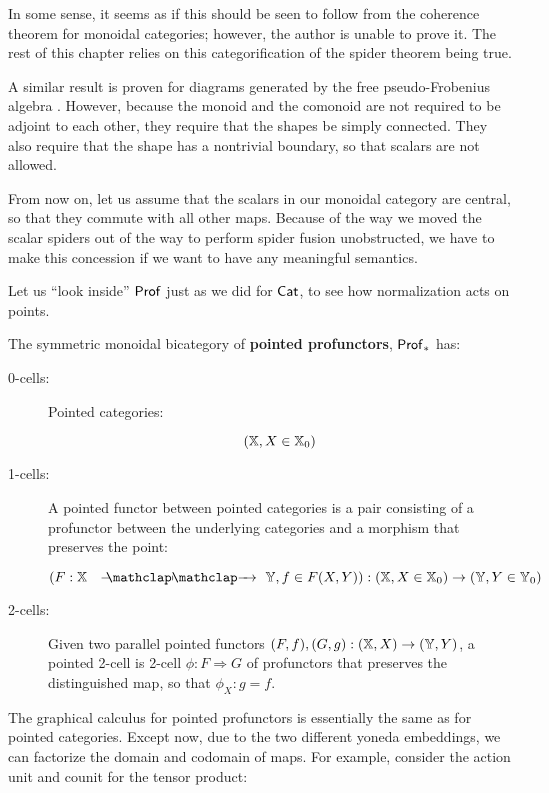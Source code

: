 In some sense, it seems as if this should be seen to follow from the coherence theorem for monoidal categories; however, the author is unable to prove it.
The rest of this chapter relies on this categorification of the spider theorem being true.  


A similar result is proven for diagrams generated by the free pseudo-Frobenius algebra \cite{dunn}.  However, because the monoid and the comonoid are not required to be adjoint to each other, they require that the shapes be simply connected.  They also require that the shape has a nontrivial boundary, so that scalars are not allowed.

From now on, let us assume that the scalars in our monoidal category are central, so that they commute with all other maps.  Because of the way we moved the scalar spiders out of the way to perform spider fusion unobstructed, we have to make this concession if we want to have any meaningful semantics.

Let us ``look inside'' ${\sf Prof}$ just as we did for ${\sf Cat}$, to see how normalization acts on points.

\begin{definition}
The symmetric monoidal bicategory of {\bf pointed profunctors}, ${\sf Prof}_*$ has:

\begin{description}
\item[0-cells:] Pointed categories:

$$(\mathbb{X}, X\in\mathbb{X}_0)$$

\item[1-cells:] A pointed functor  between pointed categories is a pair consisting of a profunctor between the underlying categories and a morphism that preserves the point:

$$(F:\X\proarrow\Y, f\in F(X,Y)):(\X, X\in\X_0)\to (\Y, Y\in\Y_0)$$

\item[2-cells:] Given two parallel pointed functors $(F, f),  (G, g):(\mathbb{X}, X)\to (\mathbb{Y},Y)$,
a pointed 2-cell is 2-cell $\phi:F\Rightarrow G$ of profunctors that preserves the distinguished map, so that $\phi_X:g=f$.
\end{description}

\end{definition}


The graphical calculus for pointed profunctors is essentially the same as for pointed categories.  Except now, due to the two different yoneda embeddings, we can factorize the domain and codomain of maps.  For example, consider the action unit and counit for the tensor product:


